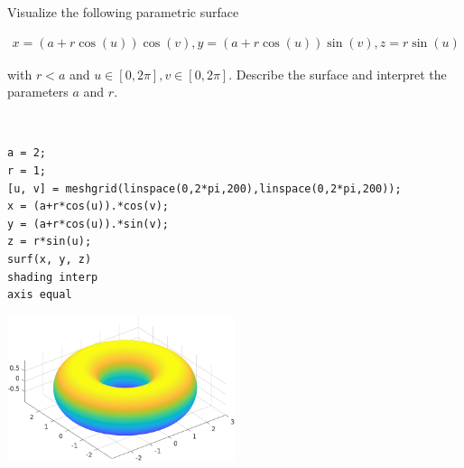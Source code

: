 Visualize the following parametric surface

\begin{align*}
    x=(a+r \cos (u)) \cos (v), y=(a+r \cos (u)) \sin (v), z=r \sin (u)
\end{align*}

with $r<a$ and $u \in[0,2 \pi], v \in[0,2 \pi]$. Describe the surface and interpret the parameters $a$ and $r$.

\begin{solution}\
\begin{lstlisting}
a = 2;
r = 1;
[u, v] = meshgrid(linspace(0,2*pi,200),linspace(0,2*pi,200));
x = (a+r*cos(u)).*cos(v);
y = (a+r*cos(u)).*sin(v);
z = r*sin(u);
surf(x, y, z)
shading interp
axis equal
\end{lstlisting}

\begin{center}
    \includegraphics[width=0.5\textwidth]{img/e16p1.png}
\end{center}
\end{solution}